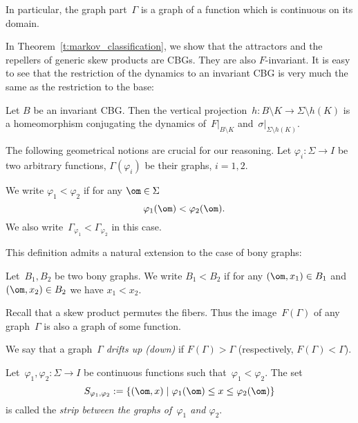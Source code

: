\documentclass[a4paper,12pt]{amsart}
\begin{document}
In particular, the graph part~$\Gamma$ is a graph of a function which is continuous on its domain. 

In Theorem~\ref{t:markov_classification}, we show that the attractors and the repellers of generic skew products are CBGs. They are also $F$-invariant. It is easy to see that the restriction of the dynamics to an invariant CBG is very much the same as the restriction to the base:

\begin{Prop} \label{p:thin_conj}
Let $B$ be an invariant CBG.
Then the vertical projection~$h \colon B\setminus K \to \Sigma \setminus h(K)$ is a homeomorphism conjugating the dynamics of~$F|_{B\setminus K}$ and~$\sigma|_{\Sigma\setminus h(K)}$.
\end{Prop}

The following geometrical notions are crucial for our reasoning.
Let $\varphi_i \colon \Sigma \to I$ be two arbitrary functions, $\Gamma(\varphi_i)$ be their graphs, $i = 1,2$.

\begin{Def} \label{def:compare}
We write $\varphi_1 < \varphi_2$ if for any $\om \in \Sigma$
$$
\quad \varphi_1(\om) < \varphi_2 (\om).
$$
We also write~$\Gamma_{\varphi_1} < \Gamma_{\varphi_2}$ in this case.
\end{Def}

This definition admits a natural extension to the case of bony graphs:
\begin{Def} \label{def:compare-bony}
Let~$B_1, B_2$ be two bony graphs. We write $B_1 < B_2$ if for any $(\om, x_1) \in B_1$ and $(\om, x_2) \in B_2$ we have $x_1 < x_2$.
\end{Def}

Recall that a skew product permutes the fibers. Thus the image~$F(\Gamma)$ of any graph~$\Gamma$ is also a graph of some function.

\begin{Def} \label{def:drift_up}
We say that a graph~$\Gamma$ \emph{drifts up (down)} if $F(\Gamma) > \Gamma$ (respectively, $F(\Gamma) < \Gamma$).
\end{Def}

\begin{Def} \label{def:strip}
Let~$\varphi_1, \varphi_2 \colon \Sigma \to I$ be continuous functions such that~$\varphi_1 < \varphi_2$. The set
$$
S_{\varphi_1, \varphi_2} := \{ (\om,x) \mid \varphi_1(\om) \le x \le \varphi_2(\om) \}
$$
is called the \emph{strip between the graphs of~$\varphi_1$ and $\varphi_2$}.
\end{Def}
\end{document}
